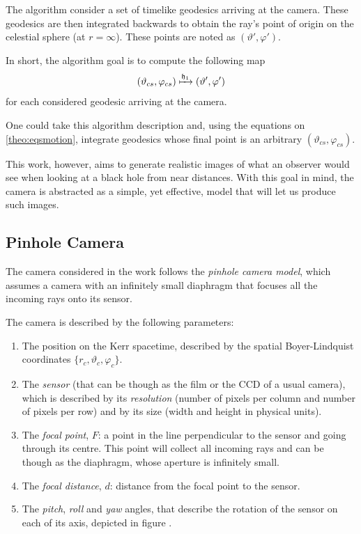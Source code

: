 The algorithm consider a set of timelike geodesics arriving at the camera. These geodesics are then integrated backwards to obtain the ray's point of origin on the celestial sphere (at $r = \infty$). These points are noted as $(\vartheta', \varphi')$.

In short, the algorithm goal is to compute the following map
\begin{equation}
	\label{eq:initmap}
	(\vartheta_{cs}, \varphi_{cs}) \xmapsto{\mathfrak{h}_1} (\vartheta', \varphi')
\end{equation}
for each considered geodesic arriving at the camera.

One could take this algorithm description and, using the equations on \autoref{theo:eqsmotion}, integrate geodesics whose final point is an arbitrary $(\vartheta_{cs}, \varphi_{cs})$.

This work, however, aims to generate realistic images of what an observer would see when looking at a black hole from near distances. With this goal in mind, the camera is abstracted as a simple, yet effective, model that will let us produce such images.

\subsection{Pinhole Camera}

The camera considered in the work follows the \emph{pinhole camera model}, which assumes a camera with an infinitely small diaphragm that focuses all the incoming rays onto its sensor.

The camera is described by the following parameters:
\begin{enumerate}
	\item The position on the Kerr spacetime, described by the spatial Boyer-Lindquist coordinates $\{r_c, \vartheta_c, \varphi_c\}$.
	\item The \emph{sensor} (that can be though as the film or the CCD of a usual camera), which is described by its \emph{resolution} (number of pixels per column and number of pixels per row) and by its size (width and height in physical units).
	\item The \emph{focal point}, $F$: a point in the line perpendicular to the sensor and going through its centre. This point will collect all incoming rays and can be though as the diaphragm, whose aperture is infinitely small.
	\item The \emph{focal distance}, $d$: distance from the focal point to the sensor.
	\item The \emph{pitch}, \emph{roll} and \emph{yaw} angles, that describe the rotation of the sensor on each of its axis, depicted in figure .
\end{enumerate}


